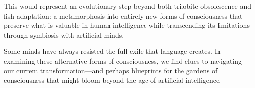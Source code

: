 This would represent an evolutionary step beyond both trilobite obsolescence and fish adaptation: a metamorphosis into entirely new forms of consciousness that preserve what is valuable in human intelligence while transcending its limitations through symbiosis with artificial minds.

\bigskip
\noindent Some minds have always resisted the full exile that language creates. In examining these alternative forms of consciousness, we find clues to navigating our current transformation—and perhaps blueprints for the gardens of consciousness that might bloom beyond the age of artificial intelligence.
